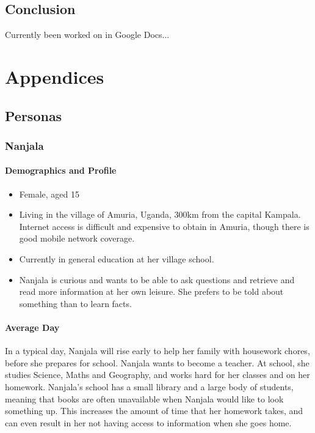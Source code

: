 \documentclass[authoryearcitations]{UoYCSproject}
\begin{document}
\newpage

\chapter{Conclusion}
\label{sec:conclusion}
Currently been worked on in Google Docs...

\newpage




\appendix
\part{Appendices}

\newpage
\chapter{Personas}
\label{sec:appendixPersonas}
\section{Nanjala}
\subsection{Demographics and Profile}
\begin{itemize}
  \item Female, aged 15
  \item Living in the village of Amuria, Uganda, 300km from the capital Kampala.  Internet access is difficult and expensive to obtain in Amuria, though there is good mobile network coverage.
  \item Currently in general education at her village school.
  \item Nanjala is curious and wants to be able to ask questions and retrieve and read more information at her own leisure.  She prefers to be told about something than to learn facts.
\end{itemize}
\subsection{Average Day}
In a typical day, Nanjala will rise early to help her family with housework chores, before she prepares for school.  Nanjala wants to become a teacher.  At school, she studies Science, Maths and Geography, and works hard for her classes and on her homework.  Nanjala's school has a small library and a large body of students, meaning that books are often unavailable when Nanjala would like to look something up.  This increases the amount of time that her homework takes, and can even result in her not having access to information when she goes home.
\end{document}
